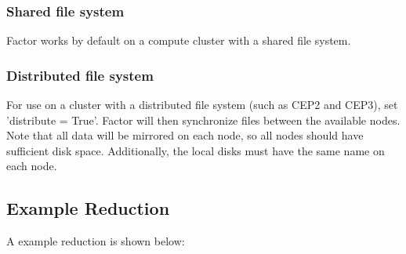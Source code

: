 \documentclass[structabstract]{article}
\begin{document}
{\subsubsection{Shared file system}
Factor works by default on a compute cluster with a shared file system.

\subsubsection{Distributed file system}
For use on a cluster with a distributed file system (such as CEP2 and CEP3), set
'distribute = True'. Factor will then synchronize files between the available
nodes. Note that all data will be mirrored on each node, so all nodes should
have sufficient disk space. Additionally, the local disks must have the same
name on each node.

\subsection{Example Reduction}
\label{factor:example}

A example reduction is shown below:

}
\end{document}
